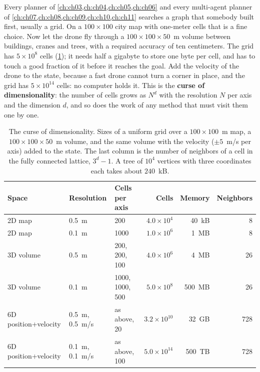 Every planner of \cref{ch:ch03,ch:ch04,ch:ch05,ch:ch06} and every multi-agent
planner of \cref{ch:ch07,ch:ch08,ch:ch09,ch:ch10,ch:ch11} searches a graph
that somebody built first, usually a grid. On a $100\times100$ city map with
one-meter cells that is a fine choice. Now let the drone fly through a
$100\times100\times50$~m volume between buildings, cranes and trees, with
a required accuracy of ten centimeters. The grid has $5\times10^{8}$ cells
(\cref{tab:ch16-gridsizes}); it needs half a gigabyte to store one byte per
cell, and \astar has to touch a good fraction of it before it reaches the
goal. Add the velocity of the drone to the state, because a fast drone
cannot turn a corner in place, and the grid has $5\times10^{14}$ cells: no
computer
holds it. This is the \textbf{curse of
dimensionality}: the number of cells grows as
$N^{d}$ with the resolution $N$ per axis and the dimension $d$, and so does
the work of any method that must visit them one by one.

\begin{table}[tb]
\centering\small
\caption{The curse of dimensionality. Sizes of a uniform grid over a
$100\times100$~m map, a $100\times100\times50$~m volume, and the same volume
with the velocity ($\pm5$~m/s per axis) added to the state. The last column
is the number of neighbors of a cell in the fully connected lattice,
$3^{d}-1$. A tree of $10^{4}$ vertices with three coordinates each takes
about $240$~kB.}
\label{tab:ch16-gridsizes}
\begin{tabular}{@{}lllrrr@{}}
\toprule
Space & Resolution & Cells per axis & Cells & Memory & Neighbors\\
\midrule
2D map & 0.5~m & 200 & $4.0\times10^{4}$ & 40~kB & 8\\
2D map & 0.1~m & 1000 & $1.0\times10^{6}$ & 1~MB & 8\\
3D volume & 0.5~m & 200, 200, 100 & $4.0\times10^{6}$ & 4~MB & 26\\
3D volume & 0.1~m & 1000, 1000, 500 & $5.0\times10^{8}$ & 500~MB & 26\\
6D position+velocity & 0.5~m, 0.5~m/s & as above, 20 & $3.2\times10^{10}$ & 32~GB & 728\\
6D position+velocity & 0.1~m, 0.1~m/s & as above, 100 & $5.0\times10^{14}$ & 500~TB & 728\\
\bottomrule
\end{tabular}
\end{table}

